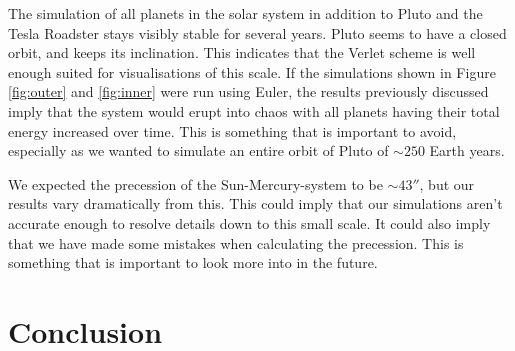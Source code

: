\documentclass[twocolumn]{aastex62}
\begin{document}
The simulation of all planets in the solar system in addition to Pluto and 
the Tesla Roadster stays visibly stable for several years. Pluto seems to 
have a closed orbit, and keeps its inclination. This indicates that 
the Verlet scheme is well enough suited for visualisations of this scale. 
If the simulations shown in Figure \ref{fig:outer} and \ref{fig:inner} 
were run using Euler, the results previously discussed imply that the 
system would erupt into chaos with all planets having their total energy 
increased over time. This is something that is important to avoid, 
especially as we wanted to simulate an entire orbit of Pluto of $\sim 250$  
Earth years.

We expected the precession of the Sun-Mercury-system to be $\sim 43''$, 
but our results vary dramatically from this. This could imply that our 
simulations aren't accurate enough to resolve details down to this small 
scale. It could also imply that we have made some mistakes when 
calculating the precession. This is something that is important to look 
more into in the future. 




\section{Conclusion} \label{sec:conclusion}

\nocite{jensen:2019}
\newpage


\end{document}
